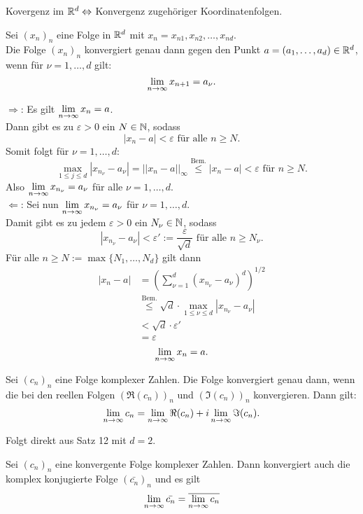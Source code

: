 \documentclass[../ana1.tex]{subfiles}
\begin{document}
Kovergenz im \(\mathbb{R}^d \Leftrightarrow \) Konvergenz zugehöriger Koordinatenfolgen.
\begin{satz}
	Sei \({(x_n)}_n\) eine Folge in \(\mathbb{R}^d\) mit \(x_n = x_{n1},x_{n2},\dots,x_{nd}\).\\
	Die Folge \({(x_n)}_n\) konvergiert genau dann gegen den Punkt \(a = (a_1,\dots,a_d)\in\mathbb{R}^d\), wenn für \(\nu = 1,\dots,d\) gilt:
	\[ \lim\limits_{n\rightarrow\infty} x_{n+1} = a_\nu. \]
\end{satz}
\begin{bew}
	\glqq{}\(\Rightarrow \)\grqq{}: Es gilt \( \lim\limits_{n\rightarrow\infty}x_n = a \).\\
	Dann gibt es zu \(\varepsilon>0\) ein \(N\in\mathbb{N} \), sodass
	\[ |x_n - a| < \varepsilon \text{ für alle } n\geq N. \]
	Somit folgt für \(\nu = 1,\dots,d\):
	\[ \underset{1\leq j\leq d}{\max} |x_{n_\nu} - a_\nu| = ||x_n - a||_\infty \overset{\text{Bem.}}{\leq} |x_n - a| < \varepsilon \text{ für }n\geq N. \]
	Also \(\lim\limits_{n\rightarrow\infty}x_{n_\nu} = a_\nu \) für alle \(\nu = 1,\dots,d\).\\
	\glqq{}\(\Leftarrow \)\grqq: Sei nun \( \lim\limits_{n\rightarrow\infty}x_{n_\nu} = a_\nu \) für \(\nu = 1,\dots,d\).\\
	Damit gibt es zu jedem \(\varepsilon>0\) ein \(N_\nu \in\mathbb{N} \), sodass
	\[ |x_{n_\nu} - a_\nu| < \varepsilon' := \frac{\varepsilon}{\sqrt{d}} \text{ für alle } n\geq N_\nu. \]
	Für alle \(n\geq N := \max \{N_1,\dots,N_d\} \) gilt dann
	\begin{align*}
		|x_n - a| &= {\left( \sum_{\nu=1}^{d} {(x_{n_\nu} - a_\nu)}^d \right)}^{1/2}\\
		&\overset{\text{Bem.}}{\leq} \sqrt{d} \cdot \underset{1\leq \nu\leq d}{\max} |x_{n_\nu} -a_\nu|\\
		&< \sqrt{d} \cdot \varepsilon'\\
		&= \varepsilon
	\end{align*}
	\[ \lim\limits_{n\rightarrow\infty} x_n = a. \]
\end{bew}
\begin{kor}
	Sei \({(c_n)}_n\) eine Folge komplexer Zahlen. Die Folge konvergiert genau dann, wenn die bei den reellen Folgen \({(\Re(c_n))}_n\) und \( {(\Im(c_n))}_n \) konvergieren. Dann gilt:
	\[ \lim\limits_{n\rightarrow\infty} c_n = \lim\limits_{n\rightarrow\infty} \Re(c_n) + i \lim\limits_{n\rightarrow\infty} \Im(c_n). \]
\end{kor}
\begin{bew}
	Folgt direkt aus Satz 12 mit \(d=2\).
\end{bew}
\begin{kor}
	Sei \({(c_n)}_n\) eine konvergente Folge komplexer Zahlen. Dann konvergiert auch die komplex konjugierte Folge \({(\bar{c_n})}_n\) und es gilt
	\[ \lim\limits_{n\rightarrow\infty} \bar{c_n} = \overline{ \lim\limits_{n\rightarrow\infty}c_n } \]
\end{kor}
\end{document}
